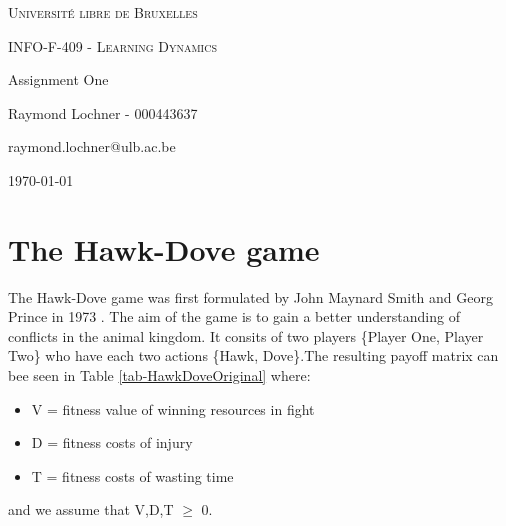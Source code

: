 \documentclass[a4paper, 11pt]{article}
\date{\today}
\begin{document}
\begin{titlepage}
	\centering
	{\scshape\LARGE Université libre de Bruxelles \par}
	\vspace{1cm}
	{\scshape\Large INFO-F-409 - Learning Dynamics\par}
	\vspace{1.5cm}
	{\huge\bfseries {Assignment One\par}}
	\vspace{2cm}
	{\Large Raymond Lochner - 000443637\par}
	\vspace{0.5cm}
	{\Large raymond.lochner@ulb.ac.be}
	\vfill
	
	\setcounter{tocdepth}{2} %
	\tableofcontents

\vfill
	{\large \today \par}
\end{titlepage}

\newpage

\section{The Hawk-Dove game}

The Hawk-Dove game was first formulated by John Maynard Smith and Georg Prince in 1973 \cite{MaynardSmith1973}. The aim of the game is to gain a better understanding of conflicts in the animal kingdom. It consits of two players \{Player One, Player Two\} who have each two actions \{Hawk, Dove\}.The resulting payoff matrix can bee seen in Table \ref{tab-HawkDoveOriginal} where:
\begin{itemize}
  \item V = fitness value of winning resources in fight
  \item D = fitness costs of injury
  \item T = fitness costs of wasting time
\end{itemize}

and we assume that V,D,T $\geq$ 0.
\end{document}
